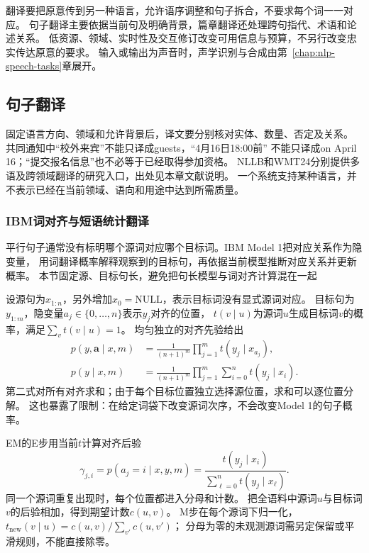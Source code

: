 翻译要把原意传到另一种语言，允许语序调整和句子拆合，不要求每个词一一对应。
句子翻译主要依据当前句及明确背景，篇章翻译还处理跨句指代、术语和论述关系。
低资源、领域、实时性及交互修订改变可用信息与预算，不另行改变忠实传达原意的要求。
输入或输出为声音时，声学识别与合成由第~\ref{chap:nlp-speech-tasks}章展开。

\subsection{句子翻译}
\label{sec:nlp-generation-sentence-translation}

固定语言方向、领域和允许背景后，译文要分别核对实体、数量、否定及关系。
共同通知中“校外来宾”不能只译成guests，“4月16日18:00前”
不能只译成on April 16；“提交报名信息”也不必等于已经取得参加资格。
NLLB和WMT24分别提供多语及跨领域翻译的研究入口，出处见本章文献说明。
一个系统支持某种语言，并不表示已经在当前领域、语向和用途中达到所需质量。

\subsubsection{IBM词对齐与短语统计翻译}
\label{sec:nlp-generation-ibm}

平行句子通常没有标明哪个源词对应哪个目标词。IBM Model 1把对应关系作为隐变量，
用词翻译概率解释观察到的目标句，再依据当前模型推断对应关系并更新概率。
本节固定源、目标句长，避免把句长模型与词对齐计算混在一起

设源句为$x_{1:n}$，另外增加$x_0=\mathrm{NULL}$，表示目标词没有显式源词对应。
目标句为$y_{1:m}$，隐变量$a_j\in\{0,\ldots,n\}$表示$y_j$对齐的位置，
$t(v\mid u)$为源词$u$生成目标词$v$的概率，满足$\sum_v t(v\mid u)=1$。
均匀独立的对齐先验给出
\begin{align}
  p(y,\bm{a}\mid x,m)
    &=\frac{1}{(n+1)^m}\prod_{j=1}^{m}t(y_j\mid x_{a_j}),\\
  p(y\mid x,m)
    &=\frac{1}{(n+1)^m}\prod_{j=1}^{m}
       \sum_{i=0}^{n}t(y_j\mid x_i).
  \label{eq:nlp-generation-ibm-likelihood}
\end{align}
第二式对所有对齐求和；由于每个目标位置独立选择源位置，求和可以逐位置分解。
这也暴露了限制：在给定词袋下改变源词次序，不会改变Model 1的句子概率。

EM的E步用当前$t$计算对齐后验
\begin{equation}
  \gamma_{j,i}
  =p(a_j=i\mid x,y,m)
  =\frac{t(y_j\mid x_i)}{\sum_{\ell=0}^{n}t(y_j\mid x_\ell)}.
  \label{eq:nlp-generation-ibm-posterior}
\end{equation}
同一个源词重复出现时，每个位置都进入分母和计数。
把全语料中源词$u$与目标词$v$的后验相加，得到期望计数$c(u,v)$。
M步在每个源词下归一化，
$t_{\mathrm{new}}(v\mid u)=c(u,v)/\sum_{v'}c(u,v')$；
分母为零的未观测源词需另定保留或平滑规则，不能直接除零。

